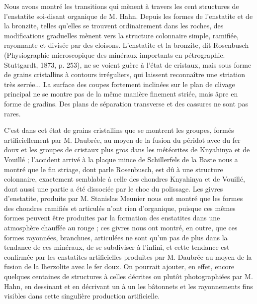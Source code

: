 \documentclass[a4paper, 12pt, oneside, french]{article}
\begin{document}
Nous avons montré les transitions qui mènent à travers les \og cent structures \fg de l'enstatite soi-disant organique de M. Hahn. Depuis les formes de l'enstatite et de la bronzite, telles qu'elles se trouvent ordinairement dans les roches, des modifications graduelles mènent vers la structure colonnaire simple, ramifiée, rayonnante et divisée par des cloisons. \og L'enstatite et la bronzite, dit Rosenbusch (Physiographie microscopique des minéraux importants en pétrographie. Stuttgardt, 1873, p. 253), ne se voient guère à l'état de cristaux, mais sous forme de grains cristallins à contours irréguliers, qui laissent reconnaître une striation très serrée... La surface des coupes fortement inclinées sur le plan de clivage principal ne se montre pas de la même manière finement striée, mais âpre en forme de gradins. Des plans de séparation transverse et des cassures ne sont pas rares. \fg

C'est dans cet état de grains cristallins que se montrent les groupes, formés artificiellement par M. Daubrée, au moyen de la fusion du péridot avec du fer doux et les groupes de cristaux plus gros dans les météorites de Knyahinya et de Vouillé ; l'accident arrivé à la plaque mince de Schillerfels de la Baste nous a montré que le fin striage, dont parle Rosenbusch, est dû à une structure colonnaire, exactement semblable à celle des chondres Knyahinya et de Vouillé, dont aussi une partie a été dissociée par le choc du polissage. Les givres d'enstatite, produits par M. Stanislas Meunier nous ont montré que les formes des chondres ramifiés et articulés n'ont rien d'organique, puisque ces mêmes formes peuvent être produites par la formation des enstatites dans une atmosphère chauffée au rouge ; ces givres nous ont montré, en outre, que ces formes rayonnées, branchues, articulées ne sont qu'un pas de plus dans la tendance de ces minéraux, de se subdiviser à l'infini, et cette tendance est confirmée par les enstatites artificielles produites par M. Daubrée au moyen de la fusion de la lherzolite avec le fer doux. On pourrait ajouter, en effet, encore quelques centaines de structures à celles décrites ou plutôt photographiées par M. Hahn, en dessinant et en décrivant un à un les bâtonnets et les rayonnements fins visibles dans cette singulière production artificielle.
\end{document}

